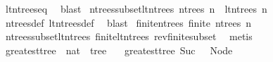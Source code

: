\begin{isabellebody}
\ lt{\isacharunderscore}{\kern0pt}n{\isacharunderscore}{\kern0pt}trees{\isacharunderscore}{\kern0pt}eq\ \isamarkupfalse%
\ blast\isanewline
{}\isamarkupfalse%
%
\endisatagproof
{\isafoldproof}%
%
\isadelimproof
\isanewline
%
\endisadelimproof
\isanewline
{}\isamarkupfalse%
\ n{\isacharunderscore}{\kern0pt}trees{\isacharunderscore}{\kern0pt}subset{\isacharunderscore}{\kern0pt}lt{\isacharunderscore}{\kern0pt}n{\isacharunderscore}{\kern0pt}trees{\isacharcolon}{\kern0pt}\ {\isachardoublequoteopen}n{\isacharunderscore}{\kern0pt}trees\ n\ {\isasymsubseteq}\ lt{\isacharunderscore}{\kern0pt}n{\isacharunderscore}{\kern0pt}trees\ n{\isachardoublequoteclose}\isanewline
%
\isadelimproof
\ \ %
\endisadelimproof
%
\isatagproof
{}\isamarkupfalse%
\ n{\isacharunderscore}{\kern0pt}trees{\isacharunderscore}{\kern0pt}def\ lt{\isacharunderscore}{\kern0pt}n{\isacharunderscore}{\kern0pt}trees{\isacharunderscore}{\kern0pt}def\ \isamarkupfalse%
\ blast%
\endisatagproof
{\isafoldproof}%
%
\isadelimproof
\isanewline
%
\endisadelimproof
\isanewline
{}\isamarkupfalse%
\ finite{\isacharunderscore}{\kern0pt}n{\isacharunderscore}{\kern0pt}trees{\isacharcolon}{\kern0pt}\ {\isachardoublequoteopen}finite\ {\isacharparenleft}{\kern0pt}n{\isacharunderscore}{\kern0pt}trees\ n{\isacharparenright}{\kern0pt}{\isachardoublequoteclose}\isanewline
%
\isadelimproof
\ \ %
\endisadelimproof
%
\isatagproof
{}\isamarkupfalse%
\ n{\isacharunderscore}{\kern0pt}trees{\isacharunderscore}{\kern0pt}subset{\isacharunderscore}{\kern0pt}lt{\isacharunderscore}{\kern0pt}n{\isacharunderscore}{\kern0pt}trees\ finite{\isacharunderscore}{\kern0pt}lt{\isacharunderscore}{\kern0pt}n{\isacharunderscore}{\kern0pt}trees\ rev{\isacharunderscore}{\kern0pt}finite{\isacharunderscore}{\kern0pt}subset\ \isamarkupfalse%
\ metis%
\endisatagproof
{\isafoldproof}%
%
\isadelimproof
%
\endisadelimproof
%
\isadelimdocument
%
\endisadelimdocument
%
\isatagdocument
%
\isamarkuptrue%
%
\endisatagdocument
{\isafolddocument}%
%
\isadelimdocument
%
\endisadelimdocument
{}\isamarkupfalse%
\ greatest{\isacharunderscore}{\kern0pt}tree\ {\isacharcolon}{\kern0pt}{\isacharcolon}{\kern0pt}\ {\isachardoublequoteopen}nat\ {\isasymRightarrow}\ tree{\isachardoublequoteclose}\ \isanewline
\ \ {\isachardoublequoteopen}greatest{\isacharunderscore}{\kern0pt}tree\ {\isacharparenleft}{\kern0pt}Suc\ {}{\isacharparenright}{\kern0pt}\ {\isacharequal}{\kern0pt}\ Node\ {\isacharbrackleft}{\kern0pt}{\isacharbrackright}{\kern0pt}{\isachardoublequoteclose}\isanewline

\end{isabellebody}
